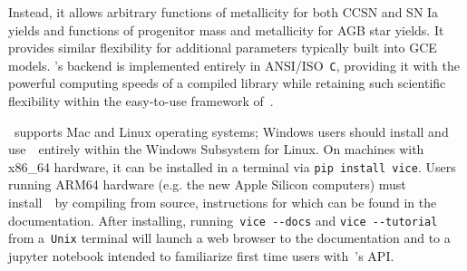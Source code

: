 \documentclass[ms.tex]{subfiles}
\begin{document}
Instead, it allows arbitrary functions of metallicity for both CCSN and SN Ia
yields and functions of progenitor mass and metallicity for AGB star yields.
It provides similar flexibility for additional parameters typically built into
GCE models.
\vice's backend is implemented entirely in ANSI/ISO~\texttt{C}, providing it
with the powerful computing speeds of a compiled library while retaining such
scientific flexibility within the easy-to-use framework of~\python.
\par
\vice~supports Mac and Linux operating systems; Windows users should install
and use~\vice~entirely within the Windows Subsystem for Linux.
On machines with x86\_64 hardware, it can be installed in a terminal via
\texttt{pip install vice}.
Users running ARM64 hardware (e.g. the new Apple Silicon computers) must
install~\vice~by compiling from source, instructions for which can be found
in the documentation.
After installing, running~\texttt{vice -{}-docs} and
\texttt{vice -{}-tutorial} from a~\texttt{Unix} terminal will launch a web
browser to the documentation and to a jupyter notebook intended to familiarize
first time users with~\vice's API.
\end{document}
